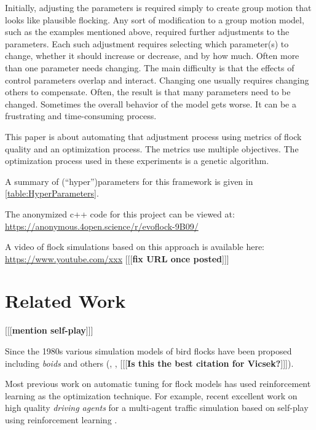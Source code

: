 \documentclass[letterpaper]{article}
\begin{document}
Initially, adjusting the parameters is required simply to create group motion that looks like plausible flocking. Any sort of modification to a group motion model, such as the examples mentioned above, required further adjustments to the parameters. Each such adjustment requires selecting which parameter(s) to change, whether it should increase or decrease, and by how much. Often more than one parameter needs changing. The main difficulty is that the effects of control parameters overlap and interact. Changing one usually requires changing others to compensate. Often, the result is that many parameters need to be changed. Sometimes the overall behavior of the model gets worse. It can be a frustrating and time-consuming process.

This paper is about automating that adjustment process using metrics of flock quality and an optimization process. The metrics use multiple objectives. The optimization process used in these experiments is a genetic algorithm.

A summary of (``hyper'')parameters for this framework is given in \ref{table:HyperParameters}.

The anonymized c++ code for this project can be viewed at:
\scriptsize
\url{https://anonymous.4open.science/r/evoflock-9B09/}
\normalsize

A video of flock simulations based on this approach is available here:
\scriptsize
\url{https://www.youtube.com/xxx}
\normalsize
[[[\textbf{fix URL once posted}]]]

\section{Related Work}
\label{sec:related}

[[[\textbf{mention self-play}]]]

Since the 1980s various simulation models of bird flocks have been proposed including \textit{boids} \citep{reynolds_flocks_1987} and others (\citet{aoki_simulation_1982}, \citet{cucker_emergent_2007}, \citet{bhattacharya_collective_2010} [[[\textbf{Is this the best citation for Vicsek?}]]]).

Most previous work on automatic tuning for flock models has used reinforcement learning \citep{sutton_reinforcement_1998} as the optimization technique. For example, recent excellent work on high quality \textit{driving agents} for a multi-agent traffic simulation based on self-play using reinforcement learning \citep{cornelisse_building_2025}.
\end{document}
